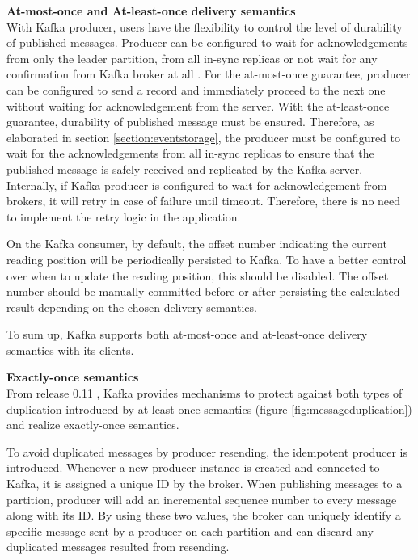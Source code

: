 \textbf{At-most-once and At-least-once delivery semantics}\\
With Kafka producer, users have the flexibility to control the level of durability of published messages. Producer can be configured to wait for acknowledgements from only the leader partition, from all in-sync replicas or not wait for any confirmation from Kafka broker at all \cite{kafkaconfigurationproducer}. For the at-most-once guarantee, producer can be configured to send a record and immediately proceed to the next one without waiting for acknowledgement from the server. With the at-least-once guarantee, durability of published message must be ensured. Therefore, as elaborated in section \ref{section:eventstorage}, the producer must be configured to wait for the acknowledgements from all in-sync replicas to ensure that the published message is safely received and replicated by the Kafka server. Internally, if Kafka producer is configured to wait for acknowledgement from brokers, it will retry in case of failure until timeout. Therefore, there is no need to implement the retry logic in the application. 

On the Kafka consumer, by default, the offset number indicating the current reading position will be periodically persisted to Kafka. To have a better control over when to update the reading position, this should be disabled. The offset number should be manually committed before or after persisting the calculated result depending on the chosen delivery semantics.   

To sum up, Kafka supports both at-most-once and at-least-once delivery semantics with its clients.

\textbf{Exactly-once semantics}\\
From release 0.11 \cite{kafkatransaction}, Kafka provides mechanisms to protect against both types of duplication introduced by at-least-once semantics (figure \ref{fig:messageduplication}) and realize exactly-once semantics. 

To avoid duplicated messages by producer resending, the idempotent producer is introduced. Whenever a new producer instance is created and connected to Kafka, it is assigned a unique ID by the broker. When publishing messages to a partition, producer will add an incremental sequence number to every message along with its ID. By using these two values, the broker can uniquely identify a specific message sent by a producer on each partition and can discard any duplicated messages resulted from resending. 

